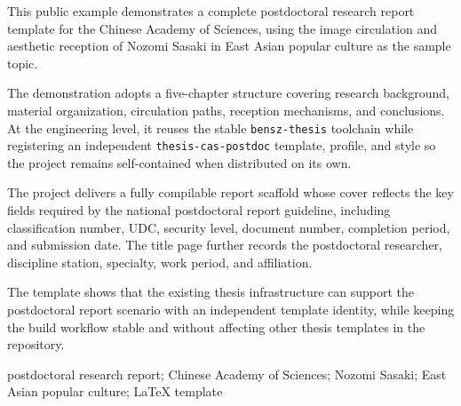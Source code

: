 This public example demonstrates a complete postdoctoral research report template for the Chinese Academy of Sciences, using the image circulation and aesthetic reception of Nozomi Sasaki in East Asian popular culture as the sample topic.

The demonstration adopts a five-chapter structure covering research background, material organization, circulation paths, reception mechanisms, and conclusions. At the engineering level, it reuses the stable \texttt{bensz-thesis} toolchain while registering an independent \texttt{thesis-cas-postdoc} template, profile, and style so the project remains self-contained when distributed on its own.

The project delivers a fully compilable report scaffold whose cover reflects the key fields required by the national postdoctoral report guideline, including classification number, UDC, security level, document number, completion period, and submission date. The title page further records the postdoctoral researcher, discipline station, specialty, work period, and affiliation.

The template shows that the existing thesis infrastructure can support the postdoctoral report scenario with an independent template identity, while keeping the build workflow stable and without affecting other thesis templates in the repository.

postdoctoral research report; Chinese Academy of Sciences; Nozomi Sasaki; East Asian popular culture; LaTeX template
